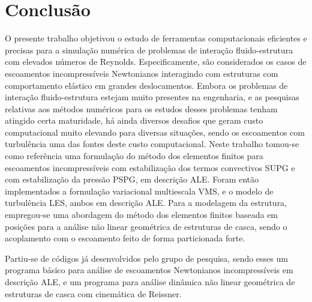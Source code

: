 \chapter{Conclusão} \label{Conclusao}

O presente trabalho objetivou o estudo de ferramentas computacionais eficientes e precisas para a simulação numérica de problemas de interação fluido-estrutura com elevados números de Reynolds. Especificamente, são considerados os casos de escoamentos incompressíveis Newtonianos interagindo com estruturas com comportamento elástico em grandes deslocamentos. Embora os problemas de interação fluido-estrutura estejam muito presentes na engenharia, e as pesquisas relativas aos métodos numéricos para os estudos desses problemas tenham atingido certa maturidade, há ainda diversos desafios que geram custo computacional muito elevando para diversas situações, sendo os escoamentos com turbulência uma das fontes deste custo computacional. Neste trabalho tomou-se como referência uma formulação do método dos elementos finitos para escoamentos incompressíveis com estabilização dos termos convectivos SUPG e com estabilização da pressão PSPG, em descrição ALE. Foram então implementados a formulação variacional multiescala VMS, e o modelo de turbulência LES, ambos em descrição ALE. Para a modelagem da estrutura, empregou-se uma abordagem do método dos elementos finitos baseada em posições para a análise não linear geométrica de estruturas de casca, sendo o acoplamento com o escoamento feito de forma particionada forte.

Partiu-se de códigos já desenvolvidos pelo grupo de pesquisa, sendo esses um programa básico para análise de escoamentos Newtonianos incompressíveis em descrição ALE, e um programa para análise dinâmica não linear geométrica de estruturas de casca com cinemática de Reissner.

